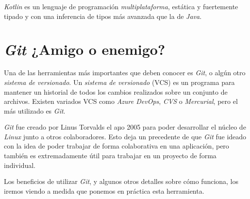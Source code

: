     \textit{Kotlin} es un lenguaje de programación \textit{multiplataforma}, estática y fuertemente 
    tipado y con una inferencia de tipos más avanzada que la de \textit{Java}.
  
  \chapter{\textit{Git} ¿Amigo o enemigo?}
    Una de las herramientas más importantes que deben conocer es \textit{Git}, o algún 
    otro \textit{sistema de versionado}.
    Un \textit{sistema de versionado} (VCS) es un programa para mantener un historial de todos los 
    cambios realizados sobre un conjunto de archivos.
    Existen variados VCS como \textit{Azure DevOps}, \textit{CVS} o \textit{Mercurial}, pero el más
    utilizado es \textit{Git}.

    \textit{Git} fue creado por Linus Torvalds el aµo 2005 para poder desarrollar el núcleo de 
    \textit{Linux} junto a otros colaboradores.
    Esto deja un precedente de que \textit{Git} fue ideado con la idea de poder trabajar de forma
    colaborativa en una aplicación, pero también es extremadamente útil para trabajar en un proyecto
    de forma individual.

    Los beneficios de utilizar \textit{Git}, y algunos otros detalles sobre cómo funciona, los 
    iremos viendo a medida que ponemos en práctica esta herramienta.


